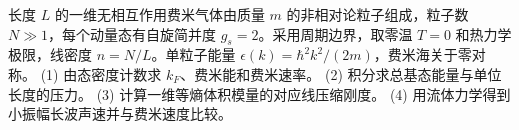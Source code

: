 长度 \(L\) 的一维无相互作用费米气体由质量 \(m\) 的非相对论粒子组成，粒子数 \(N\gg1\)，每个动量态有自旋简并度 \(g_s=2\)。采用周期边界，取零温 \(T=0\) 和热力学极限，线密度 \(n=N/L\)。单粒子能量 \(\epsilon(k)=\hbar^2k^2/(2m)\)，费米海关于零对称。
(1) 由态密度计数求 \(k_F\)、费米能和费米速率。
(2) 积分求总基态能量与单位长度的压力。
(3) 计算一维等熵体积模量的对应线压缩刚度。
(4) 用流体力学得到小振幅长波声速并与费米速度比较。
